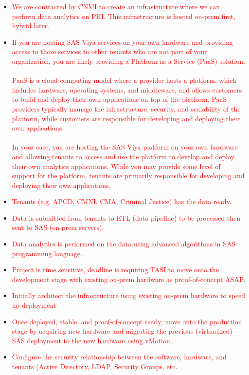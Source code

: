 \begin{itemize}
    \item \textcolor{red}{We are contracted by CNMI to create an infrastructure where we can perform data analytics on PHI. This infrastructure is hosted on-prem first, hybrid later.}
    \item \textcolor{red}{If you are hosting SAS Viya services on your own hardware and providing access to those services to other tenants who are not part of your organization, you are likely providing a Platform as a Service (PaaS) solution. \\\\PaaS is a cloud computing model where a provider hosts a platform, which includes hardware, operating systems, and middleware, and allows customers to build and deploy their own applications on top of the platform. PaaS providers typically manage the infrastructure, security, and scalability of the platform, while customers are responsible for developing and deploying their own applications. \\\\In your case, you are hosting the SAS Viya platform on your own hardware and allowing tenants to access and use the platform to develop and deploy their own analytics applications. While you may provide some level of support for the platform, tenants are primarily responsible for developing and deploying their own applications.}
    \item \textcolor{red}{Tenants (e.g. APCD, CMNI, CMA, Criminal Justice) has the data ready.}
    \item \textcolor{red}{Data is submitted from tenants to ETL (data-pipeline) to be processed then sent to SAS (on-prem servers).}
    \item \textcolor{red}{Data analytics is performed on the data using advanced algorithms in SAS programming language}. 
    \item \textcolor{red}{Project is time sensitive, deadline is requiring TASI to move onto the development stage with existing on-prem hardware as proof-of-concept ASAP}.
    \item \textcolor{red}{Initially architect the infrastructure using existing on-prem hardware to speed up deployment}
    \item \textcolor{red}{Once deployed, stable, and proof-of-concept ready, move onto the production stage by acquiring new hardware and migrating the previous (virtualized) SAS deployment to the new hardware using vMotion.}.
    \item \textcolor{red}{Configure the security relationship between the software, hardware, and tenants (Active Directory, LDAP, Security Groups, etc}.
\end{itemize}

